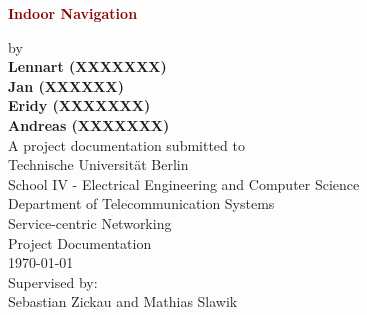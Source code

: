 \documentclass[twoside,11pt,titlepage,a4paper,english,bibliography=totocnumbered,listof=numbered]{scrbook}
\begin{document}
\frontmatter

\begin{titlepage}
	\strut
	\hfill
	\begin{center}
	\vspace{1cm}
		\Huge
		\begin{spacing}{.9}
			\textcolor{DarkRed}{\textbf{Indoor Navigation}}\\
		\end{spacing}
		\vspace{0.8cm}
		\large
		by\\
		\vspace{0.8cm}
		\textbf{Lennart (XXXXXXX)\\ Jan (XXXXXX)\\ Eridy (XXXXXXX)\\ Andreas (XXXXXXX)}\\
		\vspace{2cm}
	 	A project documentation submitted to\\
		\vspace{0.5cm}
		Technische Universität Berlin\\
		School IV - Electrical Engineering and Computer Science\\
		Department of Telecommunication Systems\\
		Service-centric Networking\\
		\vspace{0.5cm}
		Project Documentation\\
		\vspace{2.2cm}
		\today\\
		\vspace{2.0cm}
		\large
		Supervised by:\\
		Sebastian Zickau and Mathias Slawik\\
		\vspace{1cm}
		\end{center}
\end{titlepage}
\thispagestyle{empty}
\end{document}
